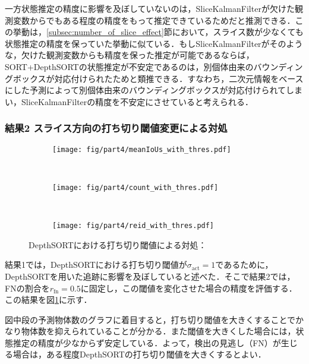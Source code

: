        一方状態推定の精度に影響を及ぼしていないのは，SliceKalmanFilterが欠けた観測変数からでもある程度の精度をもって推定できているためだと推測できる．この挙動は，\ref{subsec:number_of_slice_effect}節において，スライス数が少なくても状態推定の精度を保っていた挙動に似ている．もしSliceKalmanFilterがそのような，欠けた観測変数からも精度を保った推定が可能であるならば，SORT+DepthSORTの状態推定が不安定であるのは，別個体由来のバウンディングボックスが対応付けられたためと類推できる．すなわち，二次元情報をベースにした予測によって別個体由来のバウンディングボックスが対応付けられてしまい，SliceKalmanFilterの精度を不安定にさせていると考えられる．

        \subsubsection{結果2 スライス方向の打ち切り閾値変更による対処}

        \begin{figure}[t]
            \begin{subfigure}[t]{\linewidth}
                \centering
                \texttt{[image: fig/part4/meanIoUs\_with\_thres.pdf]}
            \end{subfigure}
            \\
            \begin{subfigure}[t]{\linewidth}
                \centering
                \texttt{[image: fig/part4/count\_with\_thres.pdf]}
            \end{subfigure}
            \\
            \begin{subfigure}[t]{\linewidth}
                \centering
                \texttt{[image: fig/part4/reid\_with\_thres.pdf]}
            \end{subfigure}
            \caption[DepthSORTにおける打ち切り閾値による対処]{DepthSORTにおける打ち切り閾値による対処：}
            \label{fig:handling_with_thres}
        \end{figure}

        結果1では，DepthSORTにおける打ち切り閾値が$\sigma_{\text{act}} = 1$であるために，DepthSORTを用いた追跡に影響を及ぼしていると述べた．そこで結果2では，FNの割合を$r_{\text{fn}} = 0.5$に固定し，この閾値を変化させた場合の精度を評価する．この結果を図\ref{fig:handling_with_thres}に示す．

        図中段の予測物体数のグラフに着目すると，打ち切り閾値を大きくすることでかなり物体数を抑えられていることが分かる．また閾値を大きくした場合には，状態推定の精度が少なからず安定している．よって，検出の見逃し（FN）が生じる場合は，ある程度DepthSORTの打ち切り閾値を大きくするとよい．

